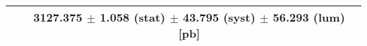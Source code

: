 \begin{tabular}{lc}
\hline
                               & 3127.375 $\pm$ 1.058 (stat) $\pm$ 43.795 (syst) $\pm$ 56.293 (lum) [pb]  \\
\hline
\end{tabular}

